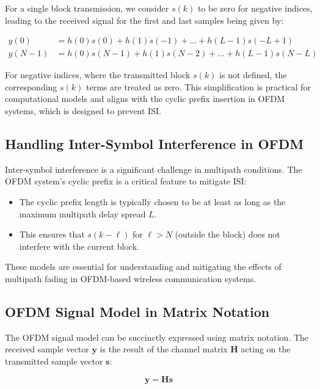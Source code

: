 For a single block transmission, we consider \(s(k)\) to be zero for negative indices, leading to the received signal for the first and last samples being given by:

\begin{align}
    y(0) &= h(0)s(0) + h(1)s(-1) + \ldots + h(L-1)s(-L+1) \\
    y(N-1) &= h(0)s(N-1) + h(1)s(N-2) + \ldots + h(L-1)s(N-L)
\end{align}

For negative indices, where the transmitted block \(s(k)\) is not defined, the corresponding \(s(k)\) terms are treated as zero. This simplification is practical for computational models and aligns with the cyclic prefix insertion in OFDM systems, which is designed to prevent ISI.

\subsection*{Handling Inter-Symbol Interference in OFDM}

Inter-symbol interference is a significant challenge in multipath conditions. The OFDM system's cyclic prefix is a critical feature to mitigate ISI:

\begin{itemize}
    \item The cyclic prefix length is typically chosen to be at least as long as the maximum multipath delay spread \(L\).
    \item This ensures that \(s(k - \ell)\) for \(\ell > N\) (outside the block) does not interfere with the current block.
\end{itemize}

These models are essential for understanding and mitigating the effects of multipath fading in OFDM-based wireless communication systems.


\subsection*{OFDM Signal Model in Matrix Notation}

The OFDM signal model can be succinctly expressed using matrix notation. The received sample vector \(\mathbf{y}\) is the result of the channel matrix \(\mathbf{H}\) acting on the transmitted sample vector \(\mathbf{s}\):

\begin{equation}
    \mathbf{y} = \mathbf{H} \mathbf{s}
\end{equation}

